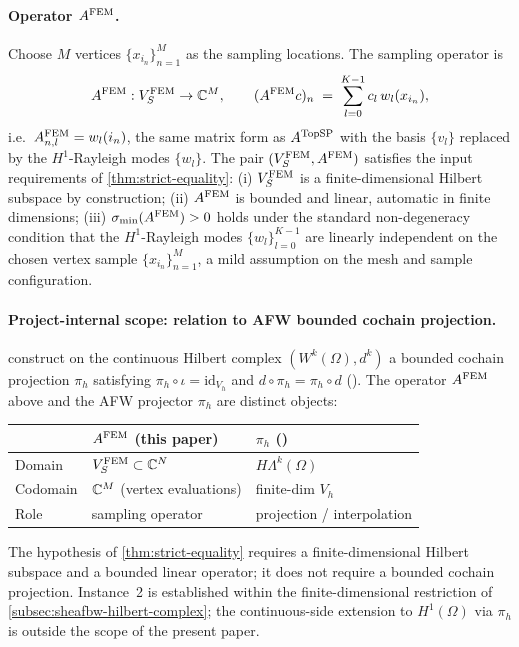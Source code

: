 \paragraph{Operator $A^{\mathrm{FEM}}$.}
Choose $M$ vertices $\{x_{i_n}\}_{n=1}^{M}$ as the sampling locations.
The sampling operator is
\[
  A^{\mathrm{FEM}} : V_S^{\mathrm{FEM}} \to \mathbb{C}^M,
  \qquad
  (A^{\mathrm{FEM}} c)_n
  \;=\;
  \sum_{l=0}^{K-1} c_l \, w_l(x_{i_n}),
\]
i.e.\ $A^{\mathrm{FEM}}_{n,l} = w_l(i_n)$, the same matrix form as
$A^{\mathrm{TopSP}}$ with the basis $\{v_l\}$ replaced by the
$H^1$-Rayleigh modes $\{w_l\}$. The pair $(V_S^{\mathrm{FEM}}, A^{\mathrm{FEM}})$
satisfies the input requirements of \cref{thm:strict-equality}: (i)
$V_S^{\mathrm{FEM}}$ is a finite-dimensional Hilbert subspace by
construction; (ii) $A^{\mathrm{FEM}}$ is bounded and linear, automatic in
finite dimensions; (iii) $\sigma_{\min}(A^{\mathrm{FEM}}) > 0$ holds under
the standard non-degeneracy condition that the $H^1$-Rayleigh modes
$\{w_l\}_{l=0}^{K-1}$ are linearly independent on the chosen vertex
sample $\{x_{i_n}\}_{n=1}^{M}$, a mild assumption on the mesh and
sample configuration.

\paragraph{Project-internal scope: relation to AFW bounded cochain projection.}
\cite{AFW2010} construct on the continuous Hilbert complex
$(W^k(\Omega), d^k)$ a bounded cochain projection $\pi_h$ satisfying
$\pi_h \circ \iota = \mathrm{id}_{V_h}$ and $d \circ \pi_h = \pi_h \circ
d$ (\cite[\S 3.1.1]{AFW2010}). The operator $A^{\mathrm{FEM}}$ above and the
AFW projector $\pi_h$ are distinct objects:

\begin{center}
\begin{tabular}{lll}
\toprule
& $A^{\mathrm{FEM}}$ (this paper) & $\pi_h$ (\cite{AFW2010}) \\
\midrule
Domain        & $V_S^{\mathrm{FEM}} \subset \mathbb{C}^N$ & $H \Lambda^k(\Omega)$ \\
Codomain      & $\mathbb{C}^M$ (vertex evaluations) & finite-dim $V_h$ \\
Role          & sampling operator & projection / interpolation \\
\bottomrule
\end{tabular}
\end{center}

The hypothesis of \cref{thm:strict-equality} requires a
finite-dimensional Hilbert subspace and a bounded linear operator; it
does not require a bounded cochain projection. Instance~2 is
established within the finite-dimensional restriction of
\cref{subsec:sheafbw-hilbert-complex}; the continuous-side extension to
$H^1(\Omega)$ via $\pi_h$ is outside the scope of the present paper.

